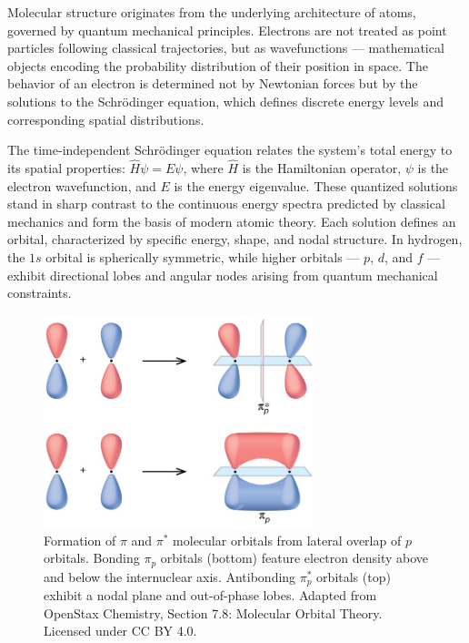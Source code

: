 Molecular structure originates from the underlying architecture of atoms, governed by quantum mechanical principles. Electrons are not treated as point particles following classical trajectories, but as wavefunctions — mathematical objects encoding the probability distribution of their position in space. The behavior of an electron is determined not by Newtonian forces but by the solutions to the Schrödinger equation, which defines discrete energy levels and corresponding spatial distributions.

The time-independent Schrödinger equation relates the system's total energy to its spatial properties: $\hat{H}\psi = E\psi$, where $\hat{H}$ is the Hamiltonian operator, $\psi$ is the electron wavefunction, and $E$ is the energy eigenvalue. These quantized solutions stand in sharp contrast to the continuous energy spectra predicted by classical mechanics and form the basis of modern atomic theory. Each solution defines an orbital, characterized by specific energy, shape, and nodal structure. In hydrogen, the $1s$ orbital is spherically symmetric, while higher orbitals — $p$, $d$, and $f$ — exhibit directional lobes and angular nodes arising from quantum mechanical constraints.


\begin{figure}[H]
\centering
\includegraphics[width=0.7\textwidth]{46_WoodwardHoffmannRules/CNX_Chem_08_04_pMOpi1.jpg}
\caption{Formation of $\pi$ and $\pi^*$ molecular orbitals from lateral overlap of $p$ orbitals. Bonding $\pi_p$ orbitals (bottom) feature electron density above and below the internuclear axis. Antibonding $\pi_p^*$ orbitals (top) exhibit a nodal plane and out-of-phase lobes. Adapted from OpenStax Chemistry, Section 7.8: Molecular Orbital Theory. Licensed under CC BY 4.0.}
\label{fig:pi_p}
\end{figure}


